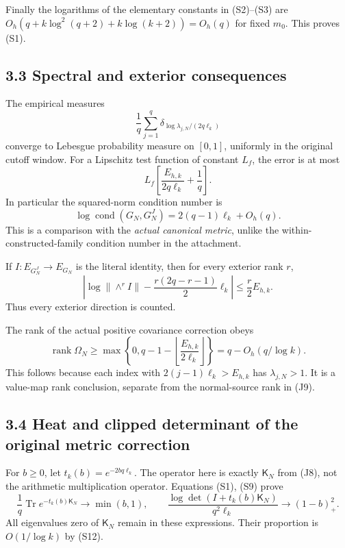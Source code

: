 \documentclass[11pt]{article}
\begin{document}
Finally the logarithms of the elementary constants in (S2)--(S3) are \(O_h(q+k\log^2(q+2)+k\log(k+2))=O_h(q)\) for fixed \(m_0\). This proves (S1).

\subsection{3.3 Spectral and exterior consequences}\label{spectral-and-exterior-consequences}

The empirical measures \[
 \frac1q\sum_{j=1}^q
 \delta_{\log\lambda_{j,N}/(2q\ell_k)}
\] converge to Lebesgue probability measure on \([0,1]\), uniformly in the original cutoff window. For a Lipschitz test function of constant \(L_f\), the error is at most \[
 L_f\left[\frac{E_{h,k}}{2q\ell_k}+\frac1q\right]. \tag{S9}
\] In particular the squared-norm condition number is \[
 \boxed{
 \log\operatorname{cond}(G_N,G_N^J)
 =2(q-1)\ell_k+O_h(q).
 } \tag{S10}
\] This is a comparison with the \emph{actual canonical metric}, unlike the within-constructed-family condition number in the attachment.

If \(I:E_{G_N^J}\to E_{G_N}\) is the literal identity, then for every exterior rank \(r\), \[
 \boxed{
 \left|
 \log\|\wedge^r I\|-
 \frac{r(2q-r-1)}2\ell_k
 \right|\le\frac r2 E_{h,k}.
 } \tag{S11}
\] Thus every exterior direction is counted.

The rank of the actual positive covariance correction obeys \[
 \operatorname{rank}\Omega_N
 \ge\max\left\{0,q-1-\left\lfloor\frac{E_{h,k}}{2\ell_k}\right\rfloor\right\}
 =q-O_h(q/\log k). \tag{S12}
\] This follows because each index with \(2(j-1)\ell_k>E_{h,k}\) has \(\lambda_{j,N}>1\). It is a value-map rank conclusion, separate from the normal-source rank in (J9).

\subsection{3.4 Heat and clipped determinant of the original metric correction}\label{heat-and-clipped-determinant-of-the-original-metric-correction}

For \(b\ge0\), let \(t_k(b)=e^{-2bq\ell_k}\). The operator here is exactly \(\mathsf K_N\) from (J8), not the arithmetic multiplication operator. Equations (S1), (S9) prove \[
 \boxed{
 \frac1q\operatorname{Tr}e^{-t_k(b)\mathsf K_N}
 \longrightarrow\min(b,1),
 }\qquad
 \boxed{
 \frac{\log\det(I+t_k(b)\mathsf K_N)}{q^2\ell_k}
 \longrightarrow(1-b)_+^2.
 } \tag{S13}
\] All eigenvalues zero of \(\mathsf K_N\) remain in these expressions. Their proportion is \(O(1/\log k)\) by (S12).
\end{document}
